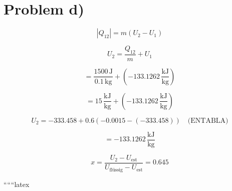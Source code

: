 \section*{Problem d)}

\begin{equation*}
|Q_{12}| = m (U_2 - U_1)
\end{equation*}

\begin{equation*}
U_2 = \frac{Q_{12}}{m} + U_1
\end{equation*}

\begin{equation*}
= \frac{1500 \, \text{J}}{0.1 \, \text{kg}} + (-133.1262 \, \frac{\text{kJ}}{\text{kg}})
\end{equation*}

\begin{equation*}
= 15 \, \frac{\text{kJ}}{\text{kg}} + (-133.1262 \, \frac{\text{kJ}}{\text{kg}})
\end{equation*}

\begin{equation*}
U_2 = -333.458 + 0.6 \left( -0.0015 - (-333.458) \right) \quad \text{(ENTABLA)}
\end{equation*}

\begin{equation*}
= -133.1262 \, \frac{\text{kJ}}{\text{kg}}
\end{equation*}


\begin{equation*}
x = \frac{U_2 - U_{\text{est}}}{U_{\text{flüssig}} - U_{\text{est}}} = 0.645
\end{equation*}

``````latex